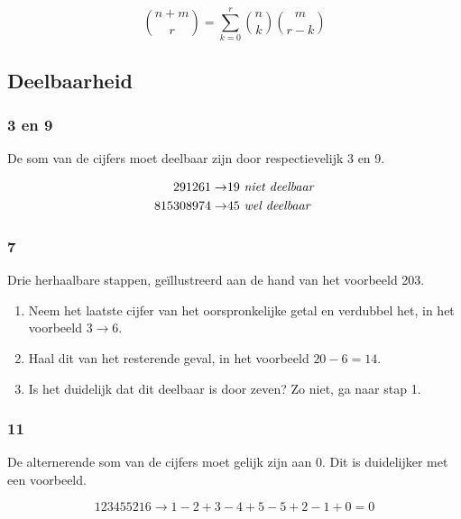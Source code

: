 \documentclass[10pt]{article}
\begin{document}
\[\binom{n+m}{r} = \sum_{k=0}^r \binom{n}{k} \binom{m}{r-k}\]

\subsection{Deelbaarheid}

\subsubsection{3 en 9}

De som van de cijfers moet deelbaar zijn door respectievelijk 3 en 9.

\begin{align*}
	291261 \to & 19 \text{ \emph{niet deelbaar}} \\
	815308974 \to & 45 \text{ \emph{wel deelbaar}}
\end{align*}

\subsubsection{7}

Drie herhaalbare stappen, ge\"illustreerd aan de hand van het voorbeeld 203.

\begin{enumerate}
	\item Neem het laatste cijfer van het oorspronkelijke getal en verdubbel het, in het voorbeeld $3 \to 6$.
	\item Haal dit van het resterende geval, in het voorbeeld $20 - 6 = 14$.
	\item Is het duidelijk dat dit deelbaar is door zeven? Zo niet, ga naar stap 1.
\end{enumerate}

\subsubsection{11}

De alternerende som van de cijfers moet gelijk zijn aan 0. Dit is duidelijker met een voorbeeld.

\[123455216 \to 1 - 2 + 3 - 4 + 5 - 5 + 2 - 1 + 0 = 0\]
\end{document}
